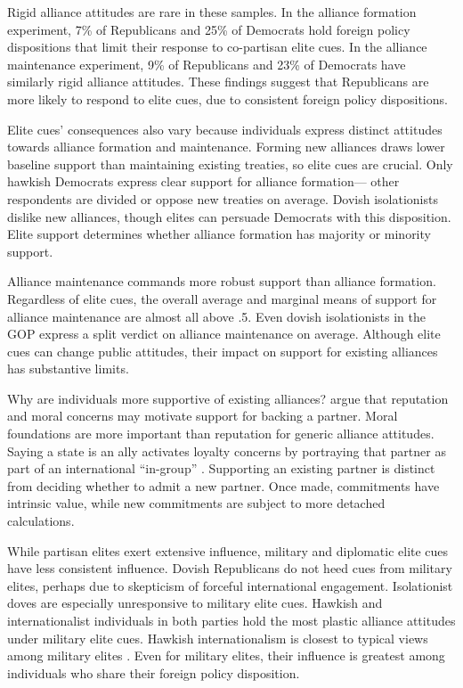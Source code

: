 \documentclass[12pt]{article}
\begin{document}
Rigid alliance attitudes are rare in these samples.
In the alliance formation experiment, 7\% of Republicans and 25\% of Democrats hold foreign policy dispositions that limit their response to co-partisan elite cues. 
In the alliance maintenance experiment, 9\% of Republicans and 23\% of Democrats have similarly rigid alliance attitudes.
These findings suggest that Republicans are more likely to respond to elite cues, due to consistent foreign policy dispositions.


Elite cues' consequences also vary because individuals express distinct attitudes towards alliance formation and maintenance. 
Forming new alliances draws lower baseline support than maintaining existing treaties, so elite cues are crucial. 
Only hawkish Democrats express clear support for alliance formation--- other respondents are divided or oppose new treaties on average.
Dovish isolationists dislike new alliances, though elites can persuade Democrats with this disposition. 
Elite support determines whether alliance formation has majority or minority support. 


Alliance maintenance commands more robust support than alliance formation. 
Regardless of elite cues, the overall average and marginal means of support for alliance maintenance are almost all above .5. 
Even dovish isolationists in the GOP express a split verdict on alliance maintenance on average.
Although elite cues can change public attitudes, their impact on support for existing alliances has substantive limits.


Why are individuals more supportive of existing alliances?
\citet{TomzWeeks2021} argue that reputation and moral concerns may motivate support for backing a partner.
Moral foundations are more important than reputation for generic alliance attitudes. 
Saying a state is an ally activates loyalty concerns by portraying that partner as part of an international ``in-group'' \citep[pg. 814]{TomzWeeks2021}. 
Supporting an existing partner is distinct from deciding whether to admit a new partner.
Once made, commitments have intrinsic value, while new commitments are subject to more detached calculations.


While partisan elites exert extensive influence, military and diplomatic elite cues have less consistent influence. 
Dovish Republicans do not heed cues from military elites, perhaps due to skepticism of forceful international engagement.
Isolationist doves are especially unresponsive to military elite cues.
Hawkish and internationalist individuals in both parties hold the most plastic alliance attitudes under military elite cues.
Hawkish internationalism is closest to typical views among military elites \citep{ZwaldBerejikian2021}. 
Even for military elites, their influence is greatest among individuals who share their foreign policy disposition. 
\end{document}
